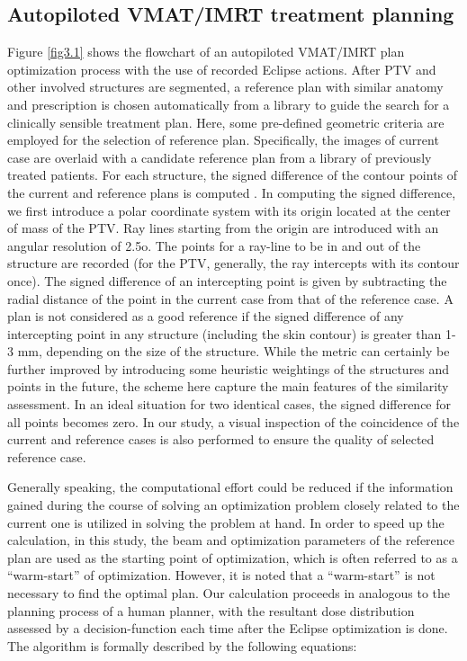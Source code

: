\subsection{Autopiloted VMAT/IMRT treatment planning}
Figure \ref{fig3.1} shows the flowchart of an autopiloted VMAT/IMRT plan optimization process with the use of recorded Eclipse actions. After PTV and other involved structures are segmented, a reference plan with similar anatomy and prescription is chosen automatically from a library to guide the search for a clinically sensible treatment plan. Here, some pre-defined geometric criteria are employed for the selection of reference plan. Specifically, the images of current case are overlaid with a candidate reference plan from a library of previously treated patients. For each structure, the signed difference of the contour points of the current and reference plans is computed \cite{schreibmann2005}. In computing the signed difference, we first introduce a polar coordinate system with its origin located at the center of mass of the PTV. Ray lines starting from the origin are introduced with an angular resolution of 2.5o. The points for a ray-line to be in and out of the structure are recorded (for the PTV, generally, the ray intercepts with its contour once). The signed difference of an intercepting point is given by subtracting the radial distance of the point in the current case from that of the reference case. A plan is not considered as a good reference if the signed difference of any intercepting point in any structure (including the skin contour) is greater than 1-3 mm, depending on the size of the structure. While the metric can certainly be further improved by introducing some heuristic weightings of the structures and points in the future, the scheme here capture the main features of the similarity assessment. In an ideal situation for two identical cases, the signed difference for all points becomes zero.  In our study, a visual inspection of the coincidence of the current and reference cases is also performed to ensure the quality of selected reference case. 

Generally speaking, the computational effort could be reduced if the information gained during the course of solving an optimization problem closely related to the current one is utilized in solving the problem at hand. In order to speed up the calculation, in this study, the beam and optimization parameters of the reference plan are used as the starting point of optimization, which is often referred to as a ``warm-start'' of optimization.  However, it is noted that a ``warm-start'' is not necessary to find the optimal plan.  Our calculation proceeds in analogous to the planning process of a human planner, with the resultant dose distribution assessed by a decision-function each time after the Eclipse optimization is done\cite{xing1999a, lee2013}. The algorithm is formally described by the following equations: 

